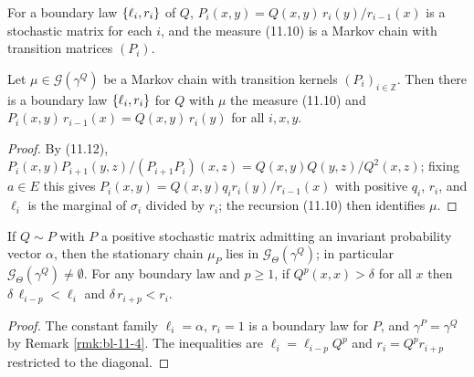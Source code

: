 \begin{definition}
    \label{def:bl-transition-matrix}
    \leanok

    For a boundary law $\left\{ \ell_i, r_i \right\}$ of $Q$, $P_i(x,y) = Q(x,y)\, r_i(y) / r_{i-1}(x)$ is a
    stochastic matrix for each $i$, and the measure (11.10) is a Markov chain with transition
    matrices $(P_i)$.
\end{definition}

\begin{theorem}[Georgii (11.9)(b)]
    \label{thm:bl-11-9b}
    \leanok

    Let $\mu \in \mathcal G(\gamma^Q)$ be a Markov chain with transition kernels
    $(P_i)_{i \in \mathbb Z}$. Then there is a boundary law $\left\{ \ell_i, r_i \right\}$ for $Q$ with
    $\mu$ the measure (11.10) and $P_i(x,y)\, r_{i-1}(x) = Q(x,y)\, r_i(y)$ for all $i, x, y$.
\end{theorem}
\begin{proof}
    \leanok
    By (11.12), $P_i(x,y)P_{i+1}(y,z)/(P_{i+1}P_i)(x,z) = Q(x,y)Q(y,z)/Q^2(x,z)$; fixing $a \in E$
    this gives $P_i(x,y) = Q(x,y) q_i r_i(y)/r_{i-1}(x)$ with positive $q_i$, $r_i$, and
    $\ell_i$ is the marginal of $\sigma_i$ divided by $r_i$; the recursion (11.10) then
    identifies $\mu$.
\end{proof}

\begin{proposition}
    \label{prop:bl-11-13}
    \leanok

    If $Q \sim P$ with $P$ a positive stochastic matrix admitting an invariant probability
    vector $\alpha$, then the stationary chain $\mu_P$ lies in $\mathcal G_\Theta(\gamma^Q)$; in
    particular $\mathcal G_\Theta(\gamma^Q) \neq \emptyset$. For any boundary law and $p \geq 1$,
    if $Q^p(x,x) > \delta$ for all $x$ then $\delta\, \ell_{i-p} < \ell_i$ and
    $\delta\, r_{i+p} < r_i$.
\end{proposition}
\begin{proof}
    \leanok
    The constant family $\ell_i = \alpha$, $r_i = 1$ is a boundary law for $P$, and
    $\gamma^P = \gamma^Q$ by Remark \ref{rmk:bl-11-4}. The inequalities are
    $\ell_i = \ell_{i-p} Q^p$ and $r_i = Q^p r_{i+p}$ restricted to the diagonal.
\end{proof}


